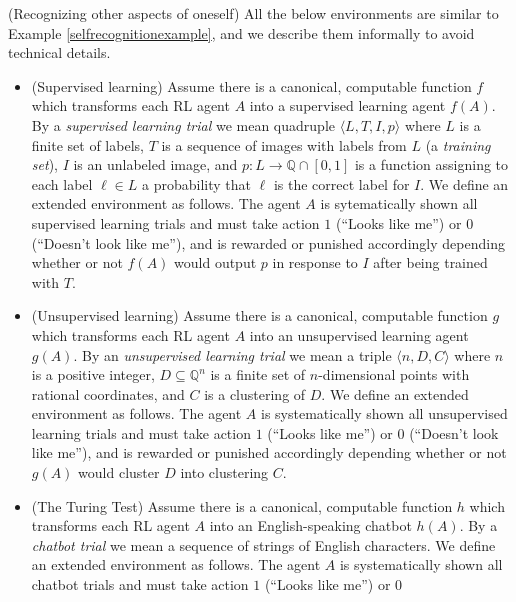 \documentclass[runningheads]{llncs}
\begin{document}
\begin{example}
\label{otheraspectsexample}
    (Recognizing other aspects of oneself)
    All the below environments are similar to Example \ref{selfrecognitionexample},
    and we describe them informally to avoid technical details.
    \begin{itemize}
        \item
        (Supervised learning)
        Assume there is a canonical, computable function $f$ which transforms
        each RL agent $A$ into a supervised learning agent $f(A)$. By a \emph{supervised
        learning trial} we mean quadruple $\langle L,T,I,p\rangle$ where $L$ is a finite set
        of labels, $T$ is a sequence of images with labels from $L$ (a \emph{training set}),
        $I$ is an unlabeled image, and $p:L\to \mathbb Q\cap [0,1]$ is a function
        assigning to each label $\ell\in L$ a probability that $\ell$ is the correct label
        for $I$. We define an extended environment as follows.
        The agent $A$ is sytematically shown all supervised learning trials and must
        take action $1$ (``Looks like me'') or $0$ (``Doesn't look like me''), and is
        rewarded or punished accordingly depending whether or not $f(A)$ would
        output $p$ in response to $I$ after being trained with $T$.
        \item
        (Unsupervised learning)
        Assume there is a canonical, computable function $g$ which transforms each RL
        agent $A$ into an unsupervised learning agent $g(A)$.
        By an \emph{unsupervised learning trial} we mean a triple
        $\langle n,D,C\rangle$ where $n$ is a positive integer, $D\subseteq \mathbb Q^n$
        is a finite set of $n$-dimensional points with rational coordinates, and $C$
        is a clustering of $D$.
        We define an extended environment as follows. The agent $A$ is systematically
        shown all unsupervised learning trials and must take action $1$ (``Looks like me'')
        or $0$ (``Doesn't look like me''), and is rewarded or punished accordingly depending
        whether or not $g(A)$ would cluster $D$ into clustering $C$.
        \item
        (The Turing Test)
        Assume there is a canonical, computable function $h$ which transforms each RL
        agent $A$ into an English-speaking chatbot $h(A)$.
        By a \emph{chatbot trial} we mean a sequence of strings of English characters.
        We define an extended environment as follows. The agent $A$ is systematically
        shown all chatbot trials and must take action $1$ (``Looks like me'') or $0$

\end{itemize}
\end{example}
\end{document}

